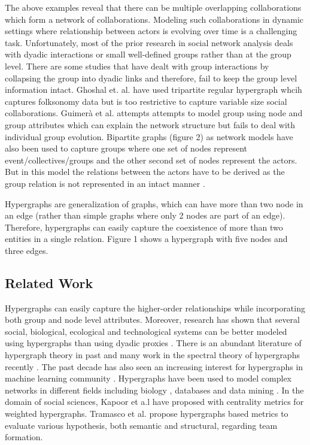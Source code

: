 \documentclass[twoside,leqno,twocolumn]{article}
\begin{document}
The above examples reveal that there can be multiple overlapping collaborations which form a network of collaborations. Modeling such collaborations in dynamic settings where relationship between actors is evolving over time is a challenging task. 
 Unfortunately, most of the prior research in social network analysis deals with dyadic interactions or small well-defined groups \cite{putnam1996bona} rather than at the group level. There are some studies that have dealt with group interactions by collapsing the group into dyadic links \cite{newman2001structure} and therefore, fail to keep the group level information intact. Ghoshal et. al. \cite{ghoshal2009random} have used tripartite regular hypergraph whcih captures folksonomy data but is too restrictive to capture variable size social collaborations. Guimerà et al. \cite{guimera2005team} attempts attempts to model group using node and group attributes which can explain the network structure but fails to deal with individual group evolution. Bipartite graphs (figure 2) as network models have also been used to capture groups \cite{faust1997centrality} where one set of nodes represent event/collectives/groups and the other second set of nodes represent the actors. But in this model the relations between the actors have to be derived as the group relation is not represented in an intact manner \cite{dhruv2013}. 

Hypergraphs are generalization of graphs, which can have more than two node in an edge (rather than simple graphs where only 2 nodes are part of an edge). Therefore, hypergraphs can easily capture the coexistence of more than two entities in a single relation. Figure 1 shows a hypergraph with five nodes and three edges.

\subsection{Related Work}

Hypergraphs can easily capture the higher-order relationships while incorporating both group and node level attributes. Moreover, research has shown that several social, biological, ecological and technological systems can be better modeled using hypergraphs than using dyadic proxies \cite{estrada2005complex}. There is an abundant literature of hypergraph theory in past \cite{berge1973graphs} and many work in the spectral theory of hypergraphs recently \cite{pearson2012spectral}\cite{xie2013h}. The past decade has also seen an increasing interest for hypergraphs in machine learning community \cite{Zhou07}\cite{tian2009hypergraph}. Hypergraphs have been used to model complex networks in different fields including biology \cite{klamt2009hypergraphs}, databases \cite{fagin1983degrees} and data mining \cite{han1998hypergraph}. In the domain of social sciences, Kapoor et a.l \cite{dhruv2013} have proposed with centrality metrics for weighted hypergraphs. Tramasco et al. \cite{taramasco2010academic} propose hypergraphs based metrics to evaluate various hypothesis, both semantic and structural, regarding team formation. 
\end{document}
